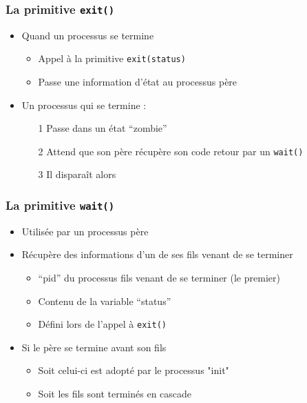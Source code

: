 \begin{frame}
\frametitle{La primitive \texttt{exit()}}
\begin{itemize}
\item Quand un processus se termine
\begin{itemize}
\item Appel à la primitive \texttt{exit(status)}
\item Passe une information d’état au processus père
\end{itemize}
\item Un processus qui se termine :
\begin{itemize}
\item[1] Passe dans un état ``zombie''
\item[2] Attend que son père récupère son code retour par un \texttt{wait()}
\item[3] Il disparaît alors
\end{itemize}
\end{itemize}
\end{frame}


\begin{frame}
\frametitle{La primitive \texttt{wait()}}
\begin{itemize}
\item<1> Utilisée par un processus père 
\item<1> Récupère des informations d’un de ses fils venant de se terminer
\begin{itemize}
\item ``pid'' du processus fils venant de se terminer (le premier)
\item Contenu de la variable ``status''
\item Défini lors de l'appel à \texttt{exit()}
\end{itemize}
\item <2>Si le père se termine avant son fils
\begin{itemize}
\item Soit celui-ci est adopté par le processus "init"
\item Soit les fils sont terminés en cascade
\end{itemize}
\end{itemize}
\end{frame}

